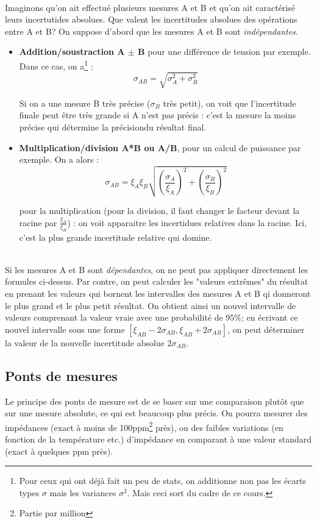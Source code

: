 \hspace{0pt} \\
Imaginons qu'on ait effectué plusieurs mesures A et B et qu'on ait caractérisé leurs incertutides absolues. Que valent les incertitudes absolues des opérations entre A et B? On suppose d'abord que les mesures A et B sont \textit{indépendantes}.
\begin{itemize}
\item \textbf{Addition/soustraction A $\pm$ B} pour une différence de tension par exemple. Dans ce cas, on a\footnote{Pour ceux qui ont déjà fait un peu de stats, on additionne non pas les écarts types $\sigma$ mais les variances $\sigma^2$. Mais ceci sort du cadre de ce cours.} :
\begin{equation}
\sigma_{AB} = \sqrt{\sigma_A^2 + \sigma_B^2}
\end{equation}

Si on a une mesure B très précise ($\sigma_B$ très petit), on voit que l'incertitude finale peut être très grande si A n'est pas précis : c'est la mesure la moins précise qui détermine la précisiondu résultat final.

\item \textbf{Multiplication/division A*B ou A/B}, pour un calcul de puissance par exemple.
On a alors :
\begin{equation}
\sigma_{AB} = \xi_A \xi_B \sqrt{(\frac{\sigma_A}{\xi_A})^2 + (\frac{\sigma_B}{\xi_B})^2}
\end{equation}

pour la multiplication (pour la division, il faut changer le facteur devant la racine par $\frac{\xi_A}{\xi_B}$) : on voit apparaitre les incertidues relatives dans la racine. Ici, c'est la plus grande incertitude relative qui domine.
\end{itemize}
\hspace{0pt} \\
Si les mesures A et B sont \textit{dépendantes}, on ne peut pas appliquer directement les formules ci-dessus. Par contre, on peut calculer les "valeurs extrêmes" du résultat en prenant les valeurs qui bornent les intervalles des mesures A et B qi donneront le plus grand et le plus petit résultat. On obtient ainsi un nouvel intervalle de valeurs comprenant la valeur vraie avec une probabilité de $95\%$; en écrivant ce nouvel intervalle sous une forme $[\xi_{AB} - 2 \sigma_{AB}, \xi_{AB} + 2 \sigma_{AB}]$, on peut déterminer la valeur de la nouvelle incertitude absolue $2 \sigma_{AB}$.

\subsection{Ponts de mesures}
Le principe des ponts de mesure est de se baser sur une comparaison plutôt que sur une mesure absolute, ce qui est beaucoup plus précis.
On pourra mesurer des impédances (exact à moins de 100ppm\footnote{Partie par million} près), ou des faibles variations (en fonction de la température etc.) d'impédance en comparant à une valeur standard (exact à quelques ppm près).

